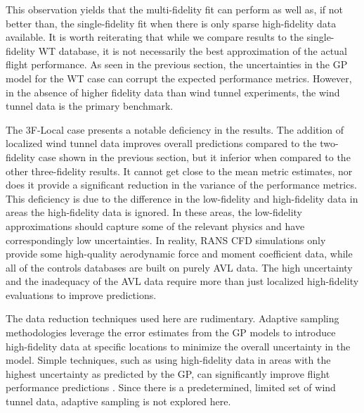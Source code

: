 This observation yields that the multi-fidelity fit can perform as well as, if not better than, the single-fidelity fit when there is only sparse high-fidelity data available. 
It is worth reiterating that while we compare results to the single-fidelity WT database, it is not necessarily the best approximation of the actual flight performance.
As seen in the previous section, the uncertainties in the GP model for the WT case can corrupt the expected performance metrics. 
However, in the absence of higher fidelity data than wind tunnel experiments, the wind tunnel data is the primary benchmark. 

The 3F-Local case presents a notable deficiency in the results. 
The addition of localized wind tunnel data improves overall predictions compared to the two-fidelity case shown in the previous section, but it inferior when compared to the other three-fidelity results. 
It cannot get close to the mean metric estimates, nor does it provide a significant reduction in the variance of the performance metrics. 
This deficiency is due to the difference in the low-fidelity and high-fidelity data in areas the high-fidelity data is ignored. 
In these areas, the low-fidelity approximations should capture some of the relevant physics and have correspondingly low uncertainties. 
In reality, RANS CFD simulations only provide some high-quality aerodynamic force and moment coefficient data, while all of the controls databases are built on purely AVL data. 
The high uncertainty and the inadequacy of the AVL data require more than just localized high-fidelity evaluations to improve predictions. 

The data reduction techniques used here are rudimentary. 
Adaptive sampling methodologies leverage the error estimates from the GP models to introduce high-fidelity data at specific locations to minimize the overall uncertainty in the model. 
Simple techniques, such as using high-fidelity data in areas with the highest uncertainty as predicted by the GP, can significantly improve flight performance predictions \cite{wendorff_combining_2016}. 
Since there is a predetermined, limited set of wind tunnel data, adaptive sampling is not explored here.